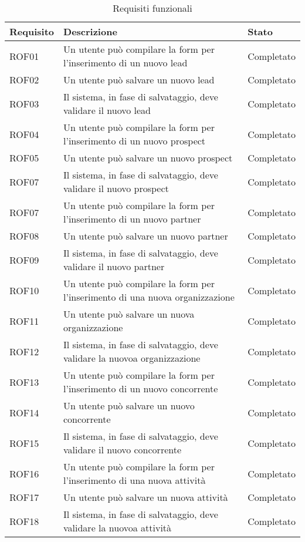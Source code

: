 \begin{longtable}[H]{|p{5cm}|p{5cm}|p{3cm}|}
	\caption{Requisiti funzionali}\\
	\hline
	\textbf{Requisito} & \textbf{Descrizione} & \textbf{Stato}\\
	\hline
	ROF01&Un utente può compilare la form per l'inserimento di un nuovo lead&Completato\\
	\hline
	ROF02&Un utente può salvare un nuovo lead&Completato\\
	\hline
	ROF03&Il sistema, in fase di salvataggio, deve validare il nuovo lead &Completato\\
	\hline
	ROF04&Un utente può compilare la form per l'inserimento di un nuovo prospect &Completato\\
	\hline
	ROF05&Un utente può salvare un nuovo prospect&Completato\\
	\hline
	ROF07&Il sistema, in fase di salvataggio, deve validare il nuovo prospect&Completato \\
	\hline
	ROF07&Un utente può compilare la form per l'inserimento di un nuovo partner  & Completato\\
	\hline
	ROF08&Un utente può salvare un nuovo partner&Completato\\
	\hline
	ROF09&Il sistema, in fase di salvataggio, deve validare il nuovo partner&Completato \\
	\hline
	ROF10&Un utente può compilare la form per l'inserimento di una nuova organizzazione  & Completato\\
	\hline
	ROF11&Un utente può salvare un nuova organizzazione&Completato\\
	\hline
	ROF12&Il sistema, in fase di salvataggio, deve validare la nuovoa organizzazione&Completato \\
	\hline
	ROF13&Un utente può compilare la form per l'inserimento di un nuovo concorrente  & Completato\\
	\hline
	ROF14&Un utente può salvare un nuovo concorrente&Completato\\
	\hline
	ROF15&Il sistema, in fase di salvataggio, deve validare il nuovo concorrente&Completato \\
	\hline
	ROF16&Un utente può compilare la form per l'inserimento di una nuova attività  & Completato\\
	\hline
	ROF17&Un utente può salvare un nuova attività&Completato\\
	\hline
	ROF18&Il sistema, in fase di salvataggio, deve validare la nuovoa attività&Completato \\

\end{longtable}
